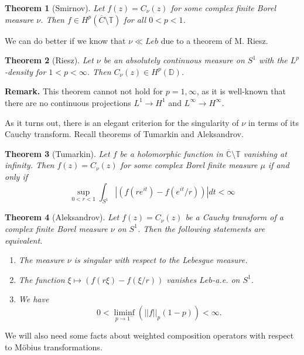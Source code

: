 \documentclass[11pt]{article}
\newtheorem{theorem}{Theorem}[section]
\begin{document}
\begin{theorem}[Smirnov]
	\label{T:Smirnov}
	Let $f(z) = C_\nu(z)$ for some complex finite Borel measure $\nu$. Then $f \in H^p(\overline{C} \setminus \mathbb{T})$ for all $0 < p < 1$.
\end{theorem}

We can do better if we know that $\nu \ll Leb$ due to a theorem of M. Riesz.

\begin{theorem}[Riesz]
	\label{Cauchy of Lp}
	Let $\nu$ be an absolutely continuous measure on $S^1$ with the $L^p$-density for $1 < p < \infty$. Then $C_\nu(z) \in H^p(\mathbb{D})$.
\end{theorem}

\textbf{Remark.} This theorem cannot not hold for $p = 1, \infty$, as it is well-known that there are no continuous projections $L^1 \rightarrow H^1$ and $L^\infty \rightarrow H^{\infty}.$

As it turns out, there is an elegant criterion for the singularity of $\nu$ in terms of its Cauchy transform. Recall theorems of Tumarkin and Aleksandrov.

\begin{theorem}[Tumarkin]
	\label{T:Tumarkin}
	Let $f$ be a holomorphic function in $\overline{\mathbb{C}} \setminus \mathbb{T}$ vanishing at infinity. Then $f(z) = C_\nu(z)$ for some complex Borel finite measure $\mu$ if and only if
	\[
	\sup\limits_{0 < r < 1} \int_{S^1} |(f(r e^{it}) - f(e^{it} / r))| dt < \infty
	\]
\end{theorem}

\begin{theorem}[Aleksandrov]
	\label{T:Aleksandrov}
	Let $f(z) = C_\nu(z)$ be a Cauchy transform of a complex finite Borel measure $\nu$ on $S^1$. Then the following statements are equivalent.
	\begin{enumerate}
		\item The measure $\nu$ is singular with respect to the Lebesgue measure.
		\item The function $\xi \mapsto (f(r \xi) - f(\xi / r))$ vanishes $Leb$-a.e. on $S^1$.
		\item We have
		\[
		0 < \liminf_{p \rightarrow 1^-} (||f||_p (1 - p) )< \infty.
		\]
	\end{enumerate}
\end{theorem}

We will also need some facts about weighted composition operators with respect to M\"obius transformations.
\end{document}
